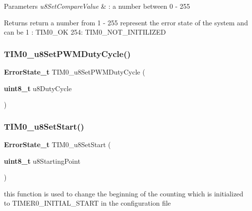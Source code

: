 \begin{DoxyParams}{Parameters}
{\em u8\+Set\+Compare\+Value} & \+: a number between 0 -\/ 255 \\
\hline
\end{DoxyParams}
\begin{DoxyReturn}{Returns}
return a number from 1 -\/ 255 represent the error state of the system and can be 1 \+: T\+I\+M0\+\_\+\+OK 254\+: T\+I\+M0\+\_\+\+N\+O\+T\+\_\+\+I\+N\+I\+T\+I\+L\+I\+Z\+ED 
\end{DoxyReturn}
\mbox{\label{_t_i_m_e_r0__interface_8h_a7c40b4a0e508474d5068471682567f39}} 
\subsubsection{T\+I\+M0\+\_\+u8\+Set\+P\+W\+M\+Duty\+Cycle()}
{\footnotesize\ttfamily \textbf{ Error\+State\+\_\+t} T\+I\+M0\+\_\+u8\+Set\+P\+W\+M\+Duty\+Cycle (\begin{DoxyParamCaption}\item[{\textbf{ uint8\+\_\+t}}]{u8\+Duty\+Cycle }\end{DoxyParamCaption})}

\mbox{\label{_t_i_m_e_r0__interface_8h_ab588fb0557b32e1d9b4c1c075a413c37}} 
\subsubsection{T\+I\+M0\+\_\+u8\+Set\+Start()}
{\footnotesize\ttfamily \textbf{ Error\+State\+\_\+t} T\+I\+M0\+\_\+u8\+Set\+Start (\begin{DoxyParamCaption}\item[{\textbf{ uint8\+\_\+t}}]{u8\+Starting\+Point }\end{DoxyParamCaption})}



this function is used to change the beginning of the counting which is initialized to T\+I\+M\+E\+R0\+\_\+\+I\+N\+I\+T\+I\+A\+L\+\_\+\+S\+T\+A\+RT in the configuration file 


